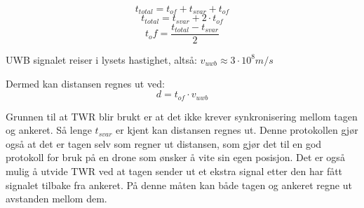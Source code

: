 \[t_{total} = t_{of} + t_{svar} + t_{of}\]
\[t_{total} = t_{svar} + 2 \cdot t_{of}\]
\[t_of = \frac{t_{total} - t_{svar}}{2}\]

UWB signalet reiser i lysets hastighet, altså: $v_{uwb} \approx 3 \cdot 10^8 m/s$

Dermed kan distansen regnes ut ved:\[d = t_{of} \cdot v_{uwb}\]


Grunnen til at TWR blir brukt er at det ikke krever synkronisering mellom tagen og ankeret. Så lenge $t_{svar}$ er kjent kan distansen regnes ut. 
Denne protokollen gjør også at det er tagen selv som regner ut distansen, 
som gjør det til en god protokoll for bruk på en drone som ønsker å vite sin egen posisjon. 
Det er også mulig å utvide TWR ved at tagen sender ut et ekstra signal etter den har fått signalet tilbake fra ankeret. 
På denne måten kan både tagen og ankeret regne ut avstanden mellom dem.

